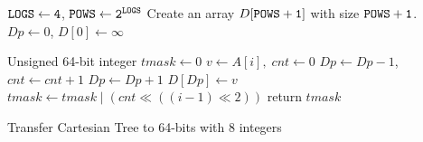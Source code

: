 \begin{algorithm}
\SetAlgoNoLine
{}

$\tt{LOGS} \gets 4$, $\tt{POWS} \gets 2^{\tt{LOGS}}$ \;
Create an array $D[\tt{POWS}+1]$ with size $\tt{POWS}+1$. \;
$\textit{Dp} \gets 0$, $D[0] \gets \infty$ \;

Unsigned 64-bit integer $\textit{tmask} \gets 0$ \;
 {
  $v \gets A[i], \; \textit{cnt} \gets 0$\;
   {
    $\textit{Dp} \gets \textit{Dp}-1$, $\textit{cnt} \gets \textit{cnt} + 1$ \;
  }
  $\textit{Dp} \gets \textit{Dp}+1$ \;
  $D[\textit{Dp}] \gets v$ \;
  $\textit{tmask} \gets \textit{tmask} \mathrel{|} (cnt \ll ((i-1) \ll 2))$ \;
}
return $tmask$ \;

  \caption{Transfer Cartesian Tree to 64-bits with 8 integers}
  \label{alg:cartesian-to-64bits}
\end{algorithm}